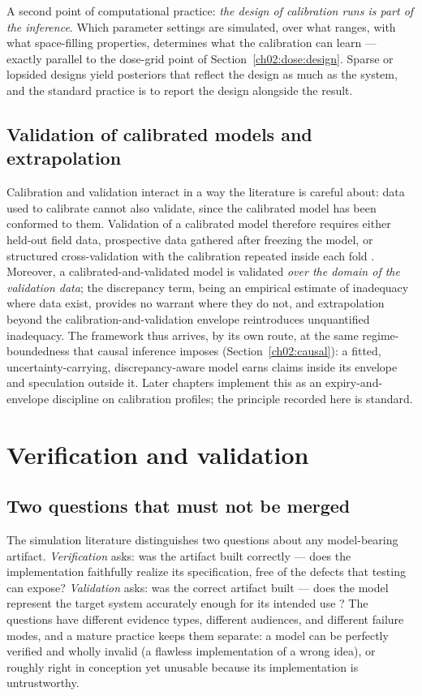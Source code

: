 A second point of computational practice: \emph{the design of calibration runs is part of the inference}. Which parameter settings are simulated, over what ranges, with what space-filling properties, determines what the calibration can learn --- exactly parallel to the dose-grid point of Section~\ref{ch02:dose:design}. Sparse or lopsided designs yield posteriors that reflect the design as much as the system, and the standard practice is to report the design alongside the result.

\subsection{Validation of calibrated models and extrapolation}\label{ch02:calibration:validation}

Calibration and validation interact in a way the literature is careful about: data used to calibrate cannot also validate, since the calibrated model has been conformed to them. Validation of a calibrated model therefore requires either held-out field data, prospective data gathered after freezing the model, or structured cross-validation with the calibration repeated inside each fold \cite{sargent}. Moreover, a calibrated-and-validated model is validated \emph{over the domain of the validation data}; the discrepancy term, being an empirical estimate of inadequacy where data exist, provides no warrant where they do not, and extrapolation beyond the calibration-and-validation envelope reintroduces unquantified inadequacy. The framework thus arrives, by its own route, at the same regime-boundedness that causal inference imposes (Section~\ref{ch02:causal}): a fitted, uncertainty-carrying, discrepancy-aware model earns claims inside its envelope and speculation outside it. Later chapters implement this as an expiry-and-envelope discipline on calibration profiles; the principle recorded here is standard.

\section{Verification and validation}\label{ch02:vv}

\subsection{Two questions that must not be merged}\label{ch02:vv:questions}

The simulation literature distinguishes two questions about any model-bearing artifact. \emph{Verification} asks: was the artifact built correctly --- does the implementation faithfully realize its specification, free of the defects that testing can expose? \emph{Validation} asks: was the correct artifact built --- does the model represent the target system accurately enough for its intended use \cite{sargent}? The questions have different evidence types, different audiences, and different failure modes, and a mature practice keeps them separate: a model can be perfectly verified and wholly invalid (a flawless implementation of a wrong idea), or roughly right in conception yet unusable because its implementation is untrustworthy.

